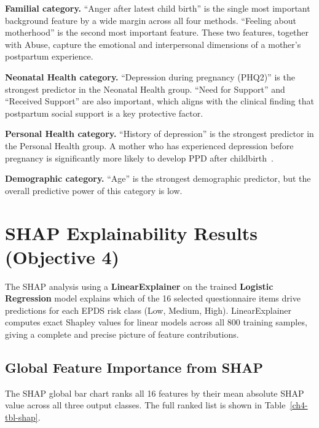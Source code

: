 \textbf{Familial category.}
``Anger after latest child birth'' is the single most important background feature by a wide margin across all four methods.
``Feeling about motherhood'' is the second most important feature.
These two features, together with Abuse, capture the emotional and interpersonal dimensions of a mother's postpartum experience.

\textbf{Neonatal Health category.}
``Depression during pregnancy (PHQ2)'' is the strongest predictor in the Neonatal Health group.
``Need for Support'' and ``Received Support'' are also important, which aligns with the clinical finding that postpartum social support is a key protective factor.

\textbf{Personal Health category.}
``History of depression'' is the strongest predictor in the Personal Health group.
A mother who has experienced depression before pregnancy is significantly more likely to develop PPD after childbirth~\cite{yazdkhasti2026systematic}.

\textbf{Demographic category.}
``Age'' is the strongest demographic predictor, but the overall predictive power of this category is low.

\section{SHAP Explainability Results (Objective 4)}
\label{ch4-sec-shap}

The SHAP analysis using a \textbf{LinearExplainer} on the trained \textbf{Logistic Regression} model explains which of the 16 selected questionnaire items drive predictions for each EPDS risk class (Low, Medium, High).
LinearExplainer computes exact Shapley values for linear models across all 800 training samples, giving a complete and precise picture of feature contributions.

\subsection{Global Feature Importance from SHAP}

The SHAP global bar chart ranks all 16 features by their mean absolute SHAP value across all three output classes.
The full ranked list is shown in Table~\ref{ch4-tbl-shap}.

